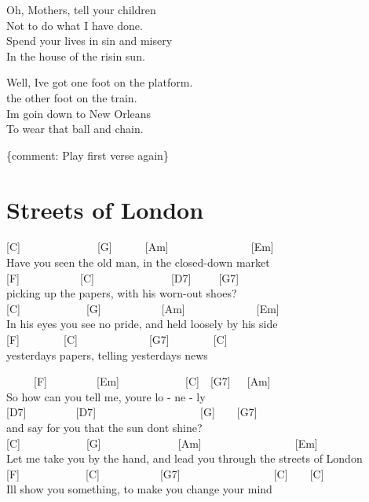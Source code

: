 \documentclass[
  letterpaper,
]{scrbook}
\begin{document}
Oh, Mothers, tell your children\\
Not to do what I have done.\\
Spend your lives in sin and misery\\
In the house of the risin\textquotesingle{} sun.

Well, I\textquotesingle ve got one foot on the platform.\\
the other foot on the train.\\
I\textquotesingle m goin\textquotesingle{} down to New Orleans\\
To wear that ball and chain.

\{comment: Play first verse again\}

\hypertarget{streets-of-london}{%
\chapter{Streets of London}\label{streets-of-london}}

{[}C{]}~~~~~~~~~~~~~~{[}G{]}~~~~~~{[}Am{]}~~~~~~~~~~~~~~~{[}Em{]}\\
Have you seen the old man, in the closed-down market\\
{[}F{]}~~~~~~~~~~~{[}C{]}~~~~~~~~~~~~~~{[}D7{]}~~~~~{[}G7{]}\\
picking up the papers, with his worn-out shoes?\\
{[}C{]}~~~~~~~~~~~~{[}G{]}~~~~~~~~~~~{[}Am{]}~~~~~~~~~~~~~{[}Em{]}\\
In his eyes you see no pride, and held loosely by his side\\
{[}F{]}~~~~~~~~{[}C{]}~~~~~~~~~~~~~{[}G7{]}~~~~~~~~{[}C{]}\\
yesterday\textquotesingle s papers, telling yesterday\textquotesingle s
news

~~~~~{[}F{]}~~~~~~~~~{[}Em{]}~~~~~~~~~~~~{[}C{]}~~{[}G7{]}~~~{[}Am{]}\\
\hspace*{0.333em}\hspace*{0.333em}\hspace*{0.333em}\hspace*{0.333em}So
how can you tell me, you\textquotesingle re lo - ne - ly\\
{[}D7{]}~~~~~~~~~{[}D7{]}~~~~~~~~~~~~~~~~~~~{[}G{]}~~~~{[}G7{]}\\
\hspace*{0.333em}\hspace*{0.333em}and say for you that the sun
don\textquotesingle t shine?\\
{[}C{]}~~~~~~~~~~~~{[}G{]}~~~~~~~~~~~~~~{[}Am{]}~~~~~~~~~~~~~~~~~{[}Em{]}\\
Let me take you by the hand, and lead you through the streets of
London\\
{[}F{]}~~~~~~~~~~~~{[}C{]}~~~~~~~~~~~{[}G7{]}~~~~~~~~~~~~~~~~~{[}C{]}~~~~{[}C{]}\\
\hspace*{0.333em}\hspace*{0.333em}I\textquotesingle ll show you
something, to make you change your mind
\end{document}
